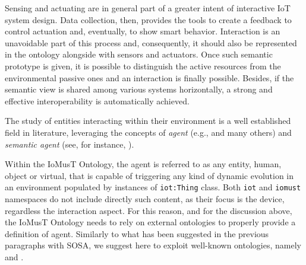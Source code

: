 

Sensing and actuating are in general part of a greater intent of interactive IoT system design. Data collection, then, provides the tools to create a feedback to control actuation and, eventually, to show smart behavior. Interaction is an unavoidable part of this process and, consequently, it should also be represented in the ontology alongside with sensors and actuators. Once such semantic prototype is given, it is possible to distinguish the active resources from the environmental passive ones and an interaction is finally possible. Besides, if the semantic view is shared among various systems horizontally, a strong and effective interoperability is automatically achieved.

The study of entities interacting within their environment is a well established field in literature, leveraging the concepts of \textit{agent} (e.g., \cite{jennings1999agent, leitao2016smart, kravari2015survey} and many others) and \textit{semantic agent} (see, for instance, \cite{hendler2001agents, lin2010modeling}). 

Within the IoMusT Ontology, the agent is referred to as any entity, human, object or virtual, that is capable of triggering any kind of dynamic evolution in an environment populated by instances of \texttt{iot:Thing} class. Both \texttt{iot} and \texttt{iomust} namespaces do not include directly such content, as their focus is the device, regardless the interaction aspect. For this reason, and for the discussion above, the IoMusT Ontology needs to rely on external ontologies to properly provide a definition of agent. Similarly to what has been suggested in the previous paragraphs with SOSA, we suggest here to exploit well-known ontologies, namely  and . 

